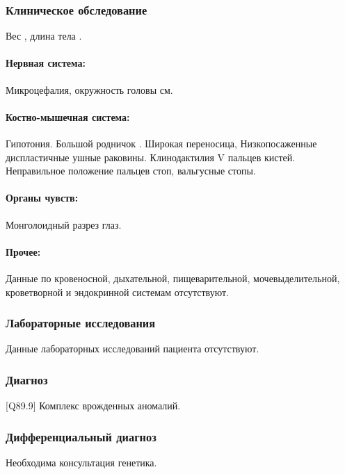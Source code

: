 \documentclass[a4paper,14pt]{extarticle}
\newcommand{\gramm}{г}
\newcommand{\cm}{см}
\newcommand{\DS}[2]{[#2] #1}
\begin{document}
\subsubsection*{Клиническое обследование}

Вес \numprint[\gramm]{3410}, длина тела \numprint[\cm]{53}.

\paragraph{Нервная система:} Микроцефалия, окружность головы \numprint[\cm]{42} см.

\paragraph{Костно-мышечная система:} Гипотония. Большой родничок \numprint[\cm]{1x1}. Широкая переносица, Низкопосаженные диспластичные ушные раковины. Клинодактилия V пальцев кистей. Неправильное положение пальцев стоп, вальгусные стопы.

\paragraph{Органы чувств:} Монголоидный разрез глаз.

\paragraph{Прочее:} Данные по кровеносной, дыхательной, пищеварительной, мочевыделительной, кроветворной и эндокринной системам отсутствуют.

\subsubsection*{Лабораторные исследования}

Данные лабораторных исследований пациента отсутствуют.

\subsubsection*{Диагноз}

\DS{Комплекс врожденных аномалий}{Q89.9}.

\subsubsection*{Дифференциальный диагноз}

Необходима консультация генетика.
\end{document}
